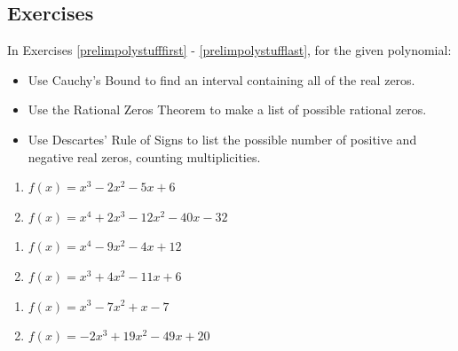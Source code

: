 \newpage

\subsection{Exercises}

In Exercises \ref{prelimpolystufffirst} - \ref{prelimpolystufflast}, for the given polynomial:

\begin{itemize}
\item  Use Cauchy's Bound to find an interval containing all of the real zeros.
\item  Use the Rational Zeros Theorem to make a list of possible rational zeros.
\item  Use Descartes' Rule of Signs to list the possible number of positive and negative real zeros, counting multiplicities.
\end{itemize}

\begin{multicols}{2}
\begin{enumerate}

\item $f(x) = x^{3} - 2x^{2} - 5x + 6$ \label{prelimpolystufffirst}
\item $f(x) = x^{4} + 2x^{3} - 12x^{2} - 40x - 32$

\setcounter{HW}{\value{enumi}}
\end{enumerate}
\end{multicols}

\begin{multicols}{2}
\begin{enumerate}
\setcounter{enumi}{\value{HW}}

\item $f(x) = x^{4} - 9x^{2} - 4x + 12$
\item $f(x) = x^{3} + 4x^{2} - 11x + 6$

\setcounter{HW}{\value{enumi}}
\end{enumerate}
\end{multicols}

\begin{multicols}{2}
\begin{enumerate}
\setcounter{enumi}{\value{HW}}

\item $f(x) = x^{3} - 7x^{2} + x - 7$
\item $f(x) = -2x^{3} + 19x^{2} - 49x + 20$

\setcounter{HW}{\value{enumi}}
\end{enumerate}
\end{multicols}

